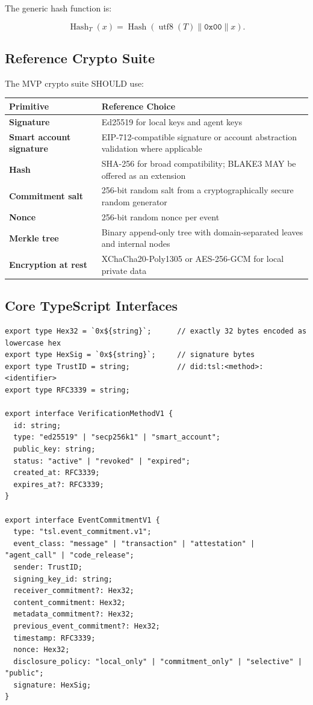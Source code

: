 \documentclass[11pt]{article}
\newcommand{\hash}{\operatorname{Hash}}
\begin{document}
The generic hash function is:

\begin{equation}
\hash_T(x) = \hash(\operatorname{utf8}(T) \parallel \texttt{0x00} \parallel x).
\end{equation}

\subsection{Reference Crypto Suite}

The MVP crypto suite SHOULD use:

\begin{center}
\begin{tabularx}{\textwidth}{>{\bfseries}p{} X}
\toprule
Primitive & Reference Choice \\
\midrule
Signature & Ed25519 for local keys and agent keys \\
Smart account signature & EIP-712-compatible signature or account abstraction validation where applicable \\
Hash & SHA-256 for broad compatibility; BLAKE3 MAY be offered as an extension \\
Commitment salt & 256-bit random salt from a cryptographically secure random generator \\
Nonce & 256-bit random nonce per event \\
Merkle tree & Binary append-only tree with domain-separated leaves and internal nodes \\
Encryption at rest & XChaCha20-Poly1305 or AES-256-GCM for local private data \\
\bottomrule
\end{tabularx}
\end{center}

\subsection{Core TypeScript Interfaces}

\begin{lstlisting}[style=tslcode]
export type Hex32 = `0x${string}`;      // exactly 32 bytes encoded as lowercase hex
export type HexSig = `0x${string}`;     // signature bytes
export type TrustID = string;           // did:tsl:<method>:<identifier>
export type RFC3339 = string;

export interface VerificationMethodV1 {
  id: string;
  type: "ed25519" | "secp256k1" | "smart_account";
  public_key: string;
  status: "active" | "revoked" | "expired";
  created_at: RFC3339;
  expires_at?: RFC3339;
}

export interface EventCommitmentV1 {
  type: "tsl.event_commitment.v1";
  event_class: "message" | "transaction" | "attestation" | "agent_call" | "code_release";
  sender: TrustID;
  signing_key_id: string;
  receiver_commitment?: Hex32;
  content_commitment: Hex32;
  metadata_commitment?: Hex32;
  previous_event_commitment?: Hex32;
  timestamp: RFC3339;
  nonce: Hex32;
  disclosure_policy: "local_only" | "commitment_only" | "selective" | "public";
  signature: HexSig;
}
\end{lstlisting}
\end{document}
